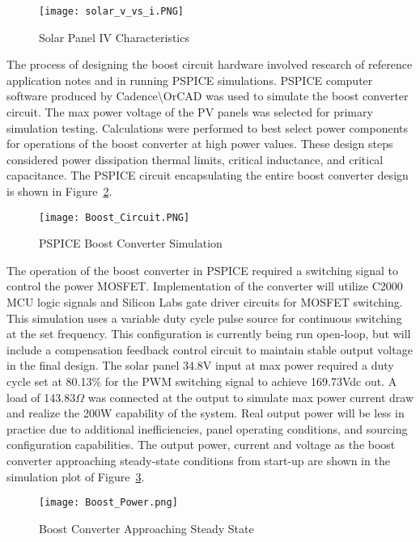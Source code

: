 \begin{figure}
\centering
\texttt{[image: solar\_v\_vs\_i.PNG]}
\caption{Solar Panel IV Characteristics}
\label{Figure 4}
\end{figure}

The process of designing the boost circuit hardware involved research of reference application notes and in running PSPICE simulations. PSPICE computer software produced by Cadence\textbackslash{}OrCAD was used to simulate the boost converter circuit. The max power voltage of the PV panels was selected for primary simulation testing. Calculations were performed to best select power components for operations of the boost converter at high power values. These design steps considered power dissipation thermal limits, critical inductance, and critical capacitance. The PSPICE circuit encapsulating the entire boost converter design is shown in Figure~\ref{boostCrct}.

\begin{figure}
\centering
\texttt{[image: Boost\_Circuit.PNG]}
\caption{PSPICE Boost Converter Simulation}
\label{boostCrct}
\end{figure}

The operation of the boost converter in PSPICE required a switching signal to control the power MOSFET. Implementation of the converter will utilize C2000 MCU logic signals and Silicon Labs gate driver circuits for MOSFET switching. This simulation uses a variable duty cycle pulse source for continuous switching at the set frequency. This configuration is currently being run open-loop, but will include a compensation feedback control circuit to maintain stable output voltage in the final design. The solar panel 34.8V input at max power required a duty cycle set at 80.13\% for the PWM switching signal to achieve 169.73Vdc out. A load of 143.83$\Omega$ was connected at the output to simulate max power current draw and realize the 200W capability of the system. Real output power will be less in practice due to additional inefficiencies, panel operating conditions, and sourcing configuration capabilities. The output power, current and voltage as the boost converter approaching steady-state conditions from start-up are shown in the simulation plot of Figure~\ref{Figure B}.

\begin{figure}
\centering
\texttt{[image: Boost\_Power.png]}
\caption{Boost Converter Approaching Steady State}
\label{Figure B}
\end{figure}

